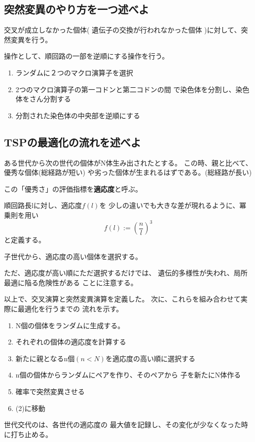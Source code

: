 \documentclass[9pt]{ltjsarticle}
\begin{document}
\subsection{突然変異のやり方を一つ述べよ}
\begin{tcolorbox}[title=突然変異に相当する操作]
    交叉が成立しなかった個体(
        遺伝子の交換が行われなかった個体
    )に対して、突然変異を行う。

    操作として、順回路の一部を逆順にする操作を行う。

    \begin{enumerate}
        \item ランダムに２つのマクロ演算子を選択
        \item 2つのマクロ演算子の第一コドンと第二コドンの間
        で染色体を分割し、染色体をさん分割する
        \item 分割された染色体の中央部を逆順にする
    \end{enumerate}
\end{tcolorbox}

\subsection{TSPの最適化の流れを述べよ}
\begin{tcolorbox}[title=適応と選択]
    ある世代から次の世代の個体がN体生み出されたとする。
    この時、親と比べて、優秀な個体(総経路が短い)
    や劣った個体が生まれるはずである。(総経路が長い)

    この「優秀さ」の評価指標を\textbf{適応度}と呼ぶ。

    順回路長lに対し、適応度$f(l)$を
    少しの違いでも大きな差が現れるように、冪乗則を用い
    \begin{equation}
        f(l):=(\frac{n}{l})^3
    \end{equation}
    と定義する。

    子世代から、適応度の高い個体を選択する。

    ただ、適応度が高い順にただ選択するだけでは、
    遺伝的多様性が失われ、局所最適に陥る危険性がある
    ことに注意する。
\end{tcolorbox}

以上で、交叉演算と突然変異演算を定義した。
次に、これらを組み合わせて実際に最適化を行うまでの
流れを示す。
\begin{tcolorbox}[title=最適化までの流れ]
\begin{enumerate}
    \item N個の個体をランダムに生成する。
    \item それぞれの個体の適応度を計算する
    \item 新たに親となるn個$(n<N)$を適応度の高い順に選択する
    \item n個の個体からランダムにペアを作り、そのペアから
    子を新たにN体作る
    \item 確率で突然変異させる
    \item (2)に移動
\end{enumerate}
世代交代のは、各世代の適応度の
最大値を記録し、その変化が少なくなった時に打ち止める。
\end{tcolorbox}
\end{document}

